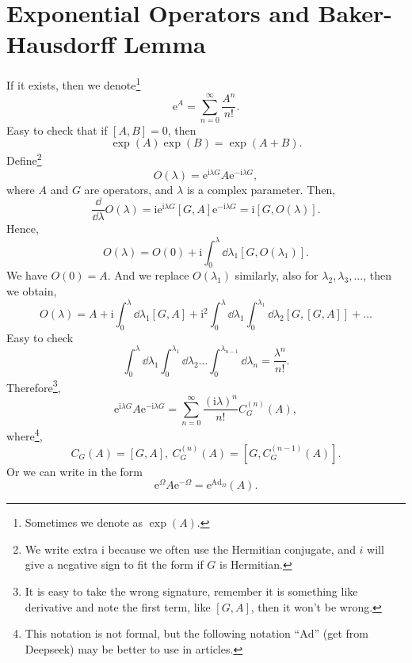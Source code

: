 \documentclass{article}
\theoremstyle{1}
\newcommand{\ii}{\mathrm{i}}
\newcommand{\ee}{\mathrm{e}}
\begin{document}
\section{Exponential Operators and Baker-Hausdorff Lemma }
If it exists, then we denote\footnote{Sometimes we denote as $\exp(A)$.}
\begin{equation}
    \ee^A=\sum_{n=0}^{\infty}\frac{A^n}{n!}.
\end{equation}
Easy to check that if $[A,B]=0$, then 
\begin{equation}
    \exp(A)\exp(B)=\exp(A+B).
\end{equation}
Define\footnote{We write extra $\ii$ because we often use the Hermitian conjugate, and $i$ will give a negative sign to fit the form if $G$ is Hermitian.}
\begin{equation}
    O(\lambda)=\ee^{\ii\lambda G}A\ee^{-\ii\lambda G},
\end{equation}
where $A$ and $G$ are operators, and $\lambda$ is a complex parameter. Then,
\begin{equation}
    \frac{\dd}{\dd{\lambda}}O(\lambda)=\ii \ee^{\ii\lambda G}[G,A]\ee^{-\ii\lambda G}=\ii[G,O(\lambda)].
\end{equation}
Hence, 
\begin{equation}
    O(\lambda)=O(0)+\ii\int_{0}^{\lambda}\dd{\lambda_1}[G,O(\lambda_1)].
\end{equation}
We have $O(0)=A$. And we replace $O(\lambda_1)$ similarly, also for $\lambda_2,\lambda_3,\dots$, then we obtain,
\begin{equation}
    O(\lambda)=A+\ii\int_{0}^{\lambda}\dd{\lambda_1}[G,A]+\ii^2\int_{0}^{\lambda}\dd{\lambda_1}\int_{0}^{\lambda_1}\dd{\lambda_2}[G,[G,A]]+\dots
\end{equation}
Easy to check 
\begin{equation}
    \int_{0}^{\lambda}\dd{\lambda_1}\int_{0}^{\lambda_1}\dd{\lambda_2}\dots\int_{0}^{\lambda_{n-1}}\dd{\lambda_n}=\frac{\lambda^n}{n!}.
\end{equation}
Therefore\footnote{ It is easy to take the wrong signature, remember it is something like derivative and note the first term, like $[G,A]$, then it won't be wrong.},
\begin{equation}
    \boxed{\ee^{\ii\lambda G}A\ee^{-\ii\lambda G}=\sum_{n=0}^{\infty}\frac{\left(\ii\lambda\right)^n}{n!}C_G^{(n)}(A)},
\end{equation}
where\footnote{This notation is not formal, but the following notation ``$\mathrm{Ad}$'' (get from Deepseek)  may be better to use in articles.}, 
\begin{equation}
    C_G(A)=[G,A],\ C_G^{(n)}(A)=[G,C_G^{(n-1)}(A)].
\end{equation}
Or we can write in the form\label{Baker-Hausdorff lemma} 
\begin{equation}
    \ee^\Omega A \ee^{-\Omega }=\ee^{\mathrm{Ad}_\Omega}(A).
\end{equation}
\end{document}
